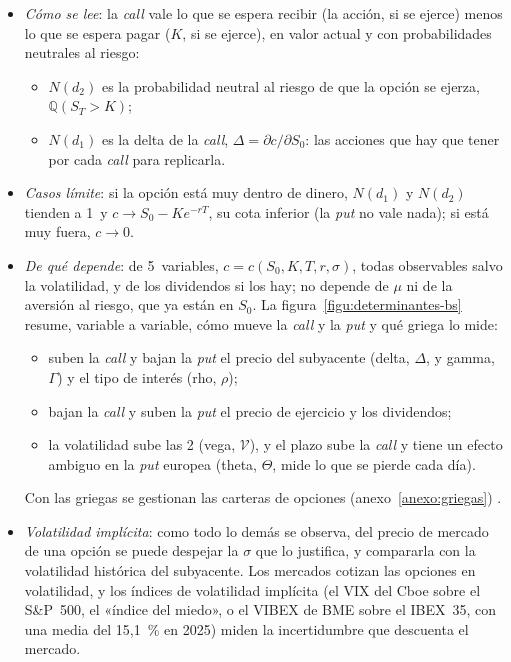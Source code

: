 \documentclass[11pt]{article}
\begin{document}
\begin{itemize}
\item \emph{Cómo se lee}: la \emph{call} vale lo que se espera recibir (la acción, si se ejerce) menos lo que se espera pagar ($K$, si se ejerce), en valor actual y con probabilidades neutrales al riesgo:
  \begin{itemize}
  \item $N(d_2)$ es la probabilidad neutral al riesgo de que la opción se ejerza, $\mathbb{Q}(S_T>K)$;
  \item $N(d_1)$ es la delta de la \emph{call}, $\Delta=\partial c/\partial S_0$: las acciones que hay que tener por cada \emph{call} para replicarla.
  \end{itemize}
\item \emph{Casos límite}: si la opción está muy dentro de dinero, $N(d_1)$ y $N(d_2)$ tienden a 1~y $c\to S_0-Ke^{-rT}$, su cota inferior (la \emph{put} no vale nada); si está muy fuera, $c\to0$.
\item \emph{De qué depende}: de 5~variables, $c=c(S_0,K,T,r,\sigma)$, todas observables salvo la volatilidad, y de los dividendos si los hay; no depende de $\mu$ ni de la aversión al riesgo, que ya están en $S_0$. La figura~\ref{figu:determinantes-bs} resume, variable a variable, cómo mueve la \emph{call} y la \emph{put} y qué griega lo mide:
  \begin{itemize}
  \item suben la \emph{call} y bajan la \emph{put} el precio del subyacente (delta, $\Delta$, y gamma, $\Gamma$) y el tipo de interés (rho, $\rho$);
  \item bajan la \emph{call} y suben la \emph{put} el precio de ejercicio y los dividendos;
  \item la volatilidad sube las 2 (vega, $\mathcal{V}$), y el plazo sube la \emph{call} y tiene un efecto ambiguo en la \emph{put} europea (theta, $\Theta$, mide lo que se pierde cada día).
  \end{itemize}
  Con las griegas se gestionan las carteras de opciones (anexo~\ref{anexo:griegas}) .
\item \emph{Volatilidad implícita}: como todo lo demás se observa, del precio de mercado de una opción se puede despejar la $\sigma$ que lo justifica, y compararla con la volatilidad histórica del subyacente. Los mercados cotizan las opciones en volatilidad, y los índices de volatilidad implícita (el VIX del Cboe sobre el S\&P~500, el «índice del miedo», o el VIBEX de BME sobre el IBEX~35, con una media del 15,1~\% en 2025) miden la incertidumbre que descuenta el mercado\nocite{BME2026InformeMercado}.
\end{itemize}
\end{document}
